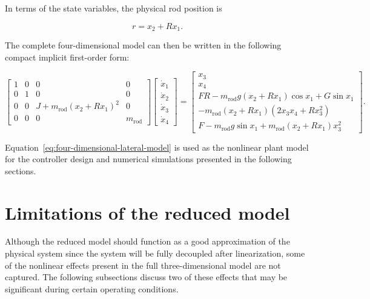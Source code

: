 In terms of the state variables, the physical rod position is

\begin{equation}
r=x_2+Rx_1.
\label{eq:rod-position-state}
\end{equation}

The complete four-dimensional model can then be written in the following compact implicit first-order form:

\begin{equation}
\begin{bmatrix}
1 & 0 & 0 & 0 \\
0 & 1 & 0 & 0 \\
0 & 0 & J+m_{\mathrm{rod}}(x_2+Rx_1)^2 & 0 \\
0 & 0 & 0 & m_{\mathrm{rod}}
\end{bmatrix}
\begin{bmatrix}
\dot{x}_1 \\
\dot{x}_2 \\
\dot{x}_3 \\
\dot{x}_4
\end{bmatrix}
=
\begin{bmatrix}
x_3
\\[4pt]
x_4
\\[4pt]
FR
-m_{\mathrm{rod}}g(x_2+Rx_1)\cos x_1
+G\sin x_1 \\
-m_{\mathrm{rod}}(x_2+Rx_1)
\left(
2x_3x_4+Rx_3^2
\right)
\\[6pt]
F
-m_{\mathrm{rod}}g\sin x_1
+m_{\mathrm{rod}}(x_2+Rx_1)x_3^2
\end{bmatrix}.
\label{eq:four-dimensional-lateral-model}
\end{equation}

Equation~\eqref{eq:four-dimensional-lateral-model} is used as the nonlinear plant model for the controller design and numerical simulations presented in the following sections.

\section{Limitations of the reduced model}

Although the reduced model should function as a good approximation of the physical system since the system will be fully decoupled after linearization, some of the nonlinear effects present in the full three-dimensional model are not captured. The following subsections discuss two of these effects that may be significant during certain operating conditions.

